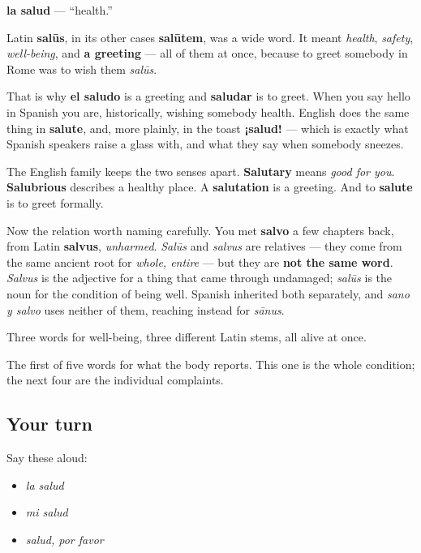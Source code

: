 \begin{cousinweb}
\textbf{la salud} — \textquotedblleft{}health.\textquotedblright{}

Latin \textbf{salūs}, in its other cases \textbf{salūtem}, was a wide word. It meant \emph{health}, \emph{safety}, \emph{well-being}, and \textbf{a greeting} — all of them at once, because to greet somebody in Rome was to wish them \emph{salūs}.

That is why \textbf{el saludo} is a greeting and \textbf{saludar} is to greet. When you say hello in Spanish you are, historically, wishing somebody health. English does the same thing in \textbf{salute}, and, more plainly, in the toast \textbf{¡salud!} — which is exactly what Spanish speakers raise a glass with, and what they say when somebody sneezes.

The English family keeps the two senses apart. \textbf{Salutary} means \emph{good for you}. \textbf{Salubrious} describes a healthy place. A \textbf{salutation} is a greeting. And to \textbf{salute} is to greet formally.

Now the relation worth naming carefully. You met \textbf{salvo} a few chapters back, from Latin \textbf{salvus}, \emph{unharmed}. \emph{Salūs} and \emph{salvus} are relatives — they come from the same ancient root for \emph{whole, entire} — but they are \textbf{not the same word}. \emph{Salvus} is the adjective for a thing that came through undamaged; \emph{salūs} is the noun for the condition of being well. Spanish inherited both separately, and \emph{sano y salvo} uses neither of them, reaching instead for \emph{sānus}.

Three words for well-being, three different Latin stems, all alive at once.
\end{cousinweb}

\begin{grammarlens}[title={What you've built}]
The first of five words for what the body reports. This one is the whole condition; the next four are the individual complaints.
\end{grammarlens}

\subsection*{Your turn}
Say these aloud:

\begin{itemize}
\raggedright
  \item \emph{la salud}
  \item \emph{mi salud}
  \item \emph{salud, por favor}
\end{itemize}


